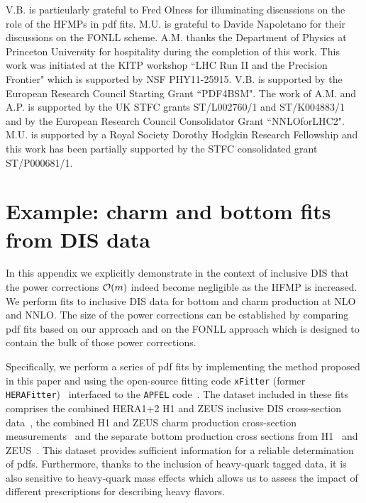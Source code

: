 \documentclass[letter,11pt]{article}
\begin{document}
\begin{acknowledgments}
V.B. is particularly grateful to Fred Olness for illuminating discussions on the role of the HFMPs in pdf fits. M.U. is grateful to Davide Napoletano for their discussions on the FONLL scheme. A.M. thanks the Department of Physics at Princeton University for hospitality during the completion of this work. This work was initiated at the KITP workshop ``LHC Run II and the Precision Frontier" which is supported by NSF PHY11-25915. V.B. is supported by the European Research Council Starting Grant ``PDF4BSM". The work of A.M. and A.P. is supported by the UK STFC grants ST/L002760/1 and ST/K004883/1 and by the European Research Council Consolidator Grant ``NNLOforLHC2". M.U. is supported by a Royal Society Dorothy Hodgkin Research Fellowship and this work has been partially supported by the STFC consolidated grant ST/P000681/1.
\end{acknowledgments}



\appendix
\section{Example: charm and bottom fits from DIS data}\label{app:BGMPUfits}


In this appendix we explicitly demonstrate in the context of inclusive DIS that the power corrections ${\cal O}(m)$ indeed become negligible as the HFMP is increased. We perform fits to inclusive DIS data for bottom and charm production at NLO and NNLO. The size of the power corrections can be established by comparing pdf fits based on our approach and on the FONLL approach which is designed to contain the bulk of those power corrections.

Specifically, we perform a series of pdf fits by implementing the method proposed in this paper and using the open-source fitting code {\tt xFitter} (former {\tt HERAFitter})~\cite{Alekhin:2014irh} interfaced to the {\tt APFEL} code~\cite{Bertone:2013vaa}. The dataset included in these fits comprises the combined HERA1+2 H1 and ZEUS inclusive DIS cross-section data~\cite{Abramowicz:2015mha}, the combined H1 and ZEUS charm production cross-section measurements~\cite{Abramowicz:1900rp} and the separate bottom production cross sections from H1~\cite{Aaron:2009af} and ZEUS~\cite{Abramowicz:2014zub}. This dataset provides sufficient information for a reliable determination of pdfs. Furthermore, thanks to the inclusion of heavy-quark tagged data, it is also sensitive to
heavy-quark mass effects which allows us to assess the impact of different prescriptions for describing heavy flavors.
\end{document}
